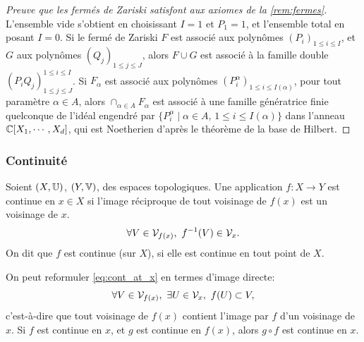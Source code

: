 \begin{proof}[Preuve que les fermés de Zariski satisfont aux axiomes de la \cref{rem:fermes}]
L'ensemble vide s'obtient en choisissant $I=1$ et $P_1=1$, et l'ensemble total en posant $I=0$. 
Si le fermé de Zariski $F$ est associé aux polynômes $(P_i)_{1 \leq i \leq I}$, et $G$ aux polynômes $(Q_j)_{1 \leq j \leq J}$, alors $F \cup G$ est associé à la famille double $(P_i Q_j)^{1 \leq i \leq I}_{1 \leq j \leq J}$. Si $F_\alpha$ est associé aux polynômes $(P^\alpha_i)_{1 \leq i \leq I(\alpha)}$, pour tout paramètre $\alpha \in A$, alors $\cap_{\alpha\in A} F_\alpha$ est associé à une famille génératrice finie quelconque de l'idéal engendré par $\{P^\alpha_i \mid \alpha \in A,\, 1 \leq i \leq I(\alpha)\}$ dans l'anneau $\mathbb{C}[X_1,\cdots,X_d]$, qui est Noetherien d'après le théorème de la base de Hilbert.
\end{proof}


\subsubsection{Continuité}
\label{subsubsec:continuite}

\begin{definition}
\label{def:continuite}
%
	Soient $(X,\mathbb{U})$, $(Y,\mathbb{V})$, des espaces topologiques. Une application $f:X \to Y$ est continue en $x \in X$ si l'image réciproque de tout voisinage de $f(x)$ est un voisinage de $x$. 
	\begin{equation}
	\label{eq:cont_at_x}
		\forall V \in \mathcal{V}_{f(x)},\ f^{-1}(V) \in \mathcal{V}_x. 
	\end{equation}
	On dit que $f$ est continue (sur $X$), si elle est continue en tout point de $X$. 
\end{definition}

On peut reformuler \eqref{eq:cont_at_x} en termes d'image directe:
\begin{equation}
\label{eq:cont_at_x_direct}
	\forall V \in \cV_{f(x)},\ \exists U \in \cV_x,\ f(U) \subset V,
\leancheck{eq:cont_at_x_direct}%
\end{equation}
c'est-à-dire que tout voisinage de $f(x)$ contient l'image par $f$ d'un voisinage de $x$.
Si $f$ est continue en $x$, et $g$ est continue en $f(x)$, alors $g \circ f$ est continue en $x$. 


